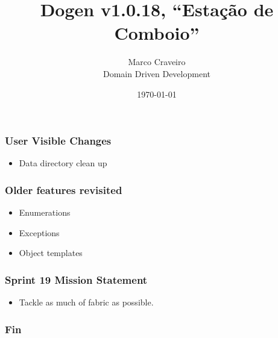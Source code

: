 \documentclass{beamer}
\title{Dogen v1.0.18, \enquote{Estação de Comboio}}
\author{Marco Craveiro \\
  Domain Driven Development
}
\date{\today}
\begin{document}
\begin{frame}
\titlepage{}
\end{frame}

\begin{frame}
\frametitle{User Visible Changes}

\begin{itemize}
  \pause{}
\item Data directory clean up
\end{itemize}

\end{frame}

\begin{frame}
\frametitle{Older features revisited}

\begin{itemize}
  \pause{}
\item Enumerations
  \pause{}
\item Exceptions
  \pause{}
\item Object templates
\end{itemize}

\end{frame}

\begin{frame}
\frametitle{Sprint 19 Mission Statement}

\begin{itemize}
\item Tackle as much of fabric as possible.
\end{itemize}

\end{frame}

\begin{frame}
\frametitle{Fin}
\end{frame}
\end{document}
